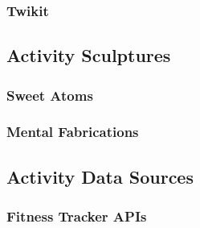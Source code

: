 \documentclass[Medieninformatik-arbeit.tex]{subfiles}
\begin{document}
\subsubsection{Twikit}

\subsection{Activity Sculptures}

\subsubsection{Sweet Atoms}

\subsubsection{Mental Fabrications}

\subsection{Activity Data Sources}

\subsubsection{Fitness Tracker APIs}
\end{document}
